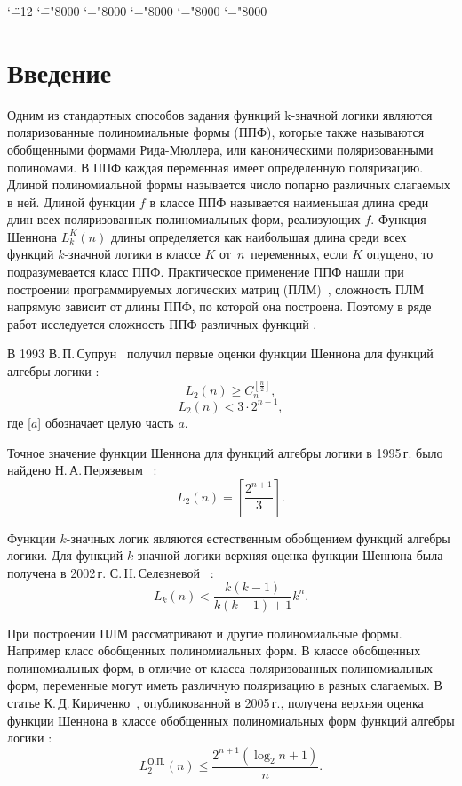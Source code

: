 \documentclass[bibliography=totoc, a4paper, 14pt]{extarticle}
\let\stdsection\section
\renewcommand\section{\newpage\stdsection}
\begin{document}
\begingroup \catcode`\"=12
\gdef\newmcodes@{\mathcode`\'39\mathcode`\*42\mathcode`\."613A%
\mathcode`\-"8000\mathcode`\/47\mathcode`\:"603A\relax}%
\endgroup
\mathcode`\=="8000 \mathcode`\+="8000 \mathcode`\-="8000
\mathcode`\<="8000 \mathcode`\>="8000


\setcounter{page}{3}
\setcounter{secnumdepth}{-1}

\tableofcontents

\section{Введение}
Одним из стандартных способов задания функций k\nobreakdash-значной логики являются поляризованные
полиномиальные формы (ППФ), которые также называются обобщенными формами Рида-Мюллера, или
каноническими поляризованными полиномами. В ППФ каждая переменная имеет определенную поляризацию.
Длиной полиномиальной формы называется число попарно различных слагаемых в ней. Длиной функции $f$
в классе ППФ называется наименьшая длина среди длин всех поляризованных полиномиальных форм,
реализующих $f$. Функция Шеннона $L^K_k(n)$ длины определяется как наибольшая длина среди всех
функций $k$\nobreakdash-значной логики в классе $K$ от~$n$~переменных, если $K$ опущено, то
подразумевается класс ППФ. Практическое применение ППФ нашли при построении программируемых
логических матриц (ПЛМ)~\cite{ue04, sb90}, сложность ПЛМ напрямую зависит от длины ППФ, по которой
она построена. Поэтому в ряде работ исследуется сложность ППФ различных функций
\cite{sv93,pn95,ss02,kk05,sd08,mn12,sm09}.

В 1993  В.\,П.\,Супрун~\cite{sv93} получил первые оценки функции Шеннона для функций алгебры логики :
$$
L_2(n) \geqslant C_n^{[\frac{n}{2}]},
$$
$$
L_2(n) < 3 \cdot 2^{n-1},
$$
где [$a$] обозначает целую часть $a$.

Точное значение функции Шеннона для функций алгебры логики в 1995\,г. было
найдено Н.\,А.\,Перязевым~\cite{pn95} :
$$
L_2(n) = \left[\frac{2^{n+1}}{3}\right].
$$

Функции $k$\nobreakdash-значных логик являются естественным обобщением функций алгебры логики.
Для функций $k$\nobreakdash-значной логики верхняя оценка функции Шеннона была получена в 2002\,г. С.\,Н.\,Селезневой~\cite{ss02} :
$$
L_k(n) < \frac{k(k-1)}{k(k-1)+1}k^n.
$$

При построении ПЛМ рассматривают и другие полиномиальные формы. Например класс обобщенных полиномиальных форм.
В классе обобщенных полиномиальных форм, в отличие от класса поляризованных полиномиальных форм, переменные могут иметь
различную поляризацию в разных слагаемых. В статье К.\,Д.\,Кириченко~\cite{kk05}, опубликованной в 2005\,г., получена верхняя оценка
функции Шеннона в классе обобщенных полиномиальных форм функций алгебры логики :
$$
L^{\text{О.П.}}_2(n) \leqslant \frac{2 ^ {n + 1}(\log_2n+1)}{n}.
$$
\end{document}
